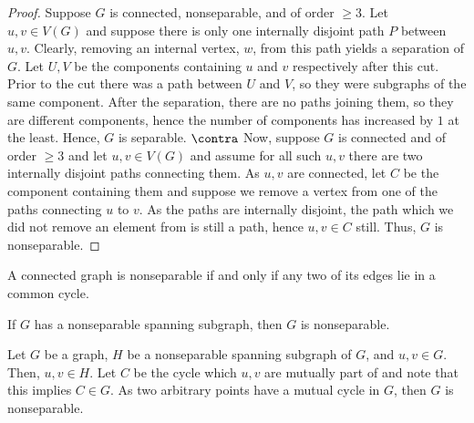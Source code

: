 \begin{proof}
	Suppose $G$ is connected, nonseparable, and of order $\ge 3$. Let $u, v \in V\left( G \right) $ and suppose there is only one internally disjoint path $P$ between $u, v$. Clearly, removing an internal vertex, $w$, from this path yields a separation of $G$. Let $U, V$ be the components containing $u$ and $v$ respectively after this cut. Prior to the cut there was a path between $U$ and $V$, so they were subgraphs of the same component. After the separation, there are no paths joining them, so they are different components, hence the number of components has increased by  $1$ at the least. Hence,  $G$ is separable. $\contra$
	Now, suppose $G$ is connected and of order $\ge 3$ and let $u, v \in V\left( G \right) $ and assume for all such $u, v$ there are two internally disjoint paths connecting them. As $u, v$ are connected, let $C$ be the component containing them and suppose we remove a vertex from one of the paths connecting $u$ to $v$. As the paths are internally disjoint, the path which we did not remove an element from is still a path, hence $u, v \in C$ still. Thus, $G$ is nonseparable.
\end{proof}
\begin{corollary}
	A connected graph is nonseparable if and only if any two of its edges lie in a common cycle.
\end{corollary}
\begin{problem}
	If $G$ has a nonseparable spanning subgraph, then $G$ is nonseparable.
\end{problem}
\begin{solution}
	Let $G$ be a graph, $H$ be a nonseparable spanning subgraph of $G$, and $u, v \in G$. Then, $u, v \in H$. Let $C$ be the cycle which $u, v$ are mutually part of and note that this implies $C \in G$. As two arbitrary points have a mutual cycle in $G$, then $G$ is nonseparable.
\end{solution}

